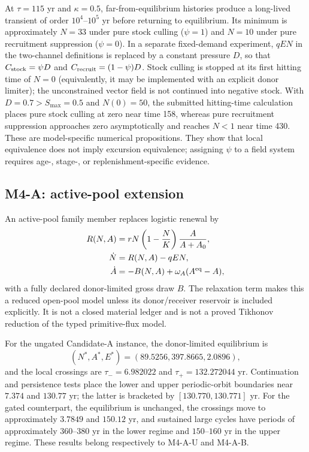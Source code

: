 \documentclass[11pt]{article}
\begin{document}
At $\tau=115$ yr and $\kappa=0.5$, far-from-equilibrium histories produce a long-lived transient of order $10^4$--$10^5$ yr before returning to equilibrium. Its minimum is approximately $N=33$ under pure stock culling ($\psi=1$) and $N=10$ under pure recruitment suppression ($\psi=0$). In a separate fixed-demand experiment, $qEN$ in the two-channel definitions is replaced by a constant pressure $D$, so that $C_{\rm stock}=\psi D$ and $C_{\rm recruit}=(1-\psi)D$. Stock culling is stopped at its first hitting time of $N=0$ (equivalently, it may be implemented with an explicit donor limiter); the unconstrained vector field is not continued into negative stock. With $D=0.7>S_{\max}=0.5$ and $N(0)=50$, the submitted hitting-time calculation places pure stock culling at zero near time 158, whereas pure recruitment suppression approaches zero asymptotically and reaches $N<1$ near time 430. These are model-specific numerical propositions. They show that local equivalence does not imply excursion equivalence; assigning $\psi$ to a field system requires age-, stage-, or replenishment-specific evidence.

\subsection{M4-A: active-pool extension}

An active-pool family member replaces logistic renewal by
\begin{align}
R(N,A)&=rN\left(1-\frac{N}{K}\right)\frac{A}{A+A_0},\\
\dot N&=R(N,A)-qEN,\\
\dot A&=-B(N,A)+\omega_A(A^{\rm eq}-A),
\end{align}
with a fully declared donor-limited gross draw $B$. The relaxation term makes this a reduced open-pool model unless its donor/receiver reservoir is included explicitly. It is not a closed material ledger and is not a proved Tikhonov reduction of the typed primitive-flux model.

For the ungated Candidate-A instance, the donor-limited equilibrium is
\[
(N^*,A^*,E^*)=(89.5256,397.8665,2.0896),
\]
and the local crossings are $\tau_-=6.982022$ and $\tau_+=132.272044$ yr. Continuation and persistence tests place the lower and upper periodic-orbit boundaries near $7.374$ and $130.77$ yr; the latter is bracketed by $[130.770,130.771]$ yr. For the gated counterpart, the equilibrium is unchanged, the crossings move to approximately $3.7849$ and $150.12$ yr, and sustained large cycles have periods of approximately $360$--$380$ yr in the lower regime and $150$--$160$ yr in the upper regime. These results belong respectively to M4-A-U and M4-A-B.
\end{document}
